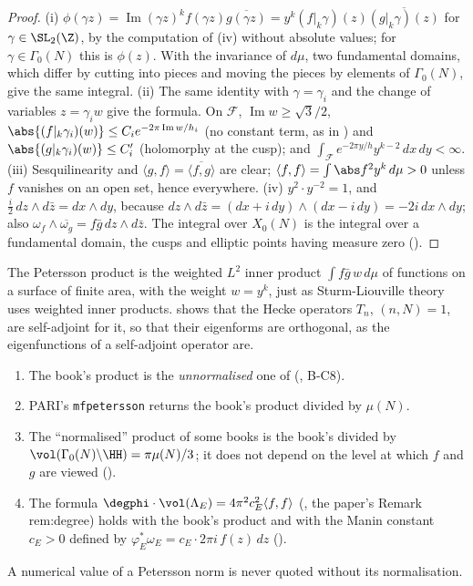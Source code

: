 \begin{proof}
(i) $\phi(\gamma z)=\operatorname{Im}(\gamma z)^kf(\gamma z)\overline{g(\gamma z)}=y^k(f|_k\gamma)(z)\overline{(g|_k\gamma)(z)}$ for $\gamma\in\SL_2(\Z)$, by the computation of (iv)
without absolute values; for $\gamma\in\Gamma_0(N)$ this is $\phi(z)$. With the invariance of $d\mu$, two fundamental domains, which differ by cutting into pieces and moving the pieces
by elements of $\Gamma_0(N)$, give the same integral.
(ii) The same identity with $\gamma=\gamma_i$ and the change of variables $z=\gamma_iw$ give the formula. On $\mathcal F$, $\operatorname{Im}w\ge\sqrt3/2$, $\abs{(f|_k\gamma_i)(w)}\le C_ie^{-2\pi\operatorname{Im}w/h_i}$
(no constant term, as in ) and $\abs{(g|_k\gamma_i)(w)}\le C_i'$ (holomorphy at the cusp); and $\int_{\mathcal F}e^{-2\pi y/h}y^{k-2}\,dx\,dy<\infty$.
(iii) Sesquilinearity and $\langle g,f\rangle=\overline{\langle f,g\rangle}$ are clear; $\langle f,f\rangle=\int\abs f^2y^k\,d\mu>0$ unless $f$ vanishes on an open set, hence everywhere.
(iv) $y^2\cdot y^{-2}=1$, and $\frac i2\,dz\wedge d\bar z=dx\wedge dy$, because $dz\wedge d\bar z=(dx+i\,dy)\wedge(dx-i\,dy)=-2i\,dx\wedge dy$; also
$\omega_f\wedge\overline{\omega_g}=f\bar g\,dz\wedge d\bar z$. The integral over $X_0(N)$ is the integral over a fundamental domain, the cusps and elliptic points having measure
zero ().
\end{proof}

The Petersson product is the weighted $L^2$ inner product $\int f\bar g\,w\,d\mu$ of functions on a surface of finite area, with the weight $w=y^k$, just as Sturm-Liouville
theory uses weighted inner products.  shows that the Hecke operators $T_n$, $(n,N)=1$, are self-adjoint for it, so that their eigenforms are orthogonal, as
the eigenfunctions of a self-adjoint operator are.

\begin{convention}\label{conv:modforms:petersson-normalisations}
\leavevmode
\begin{enumerate}[label=(\alph*)]
\item The book's product is the \emph{unnormalised} one of  (, B-C8).
\item PARI's \texttt{mfpetersson} returns the book's product divided by $\mu(N)$.
\item The ``normalised'' product of some books is the book's divided by $\vol(\Gamma_0(N)\backslash\HH)=\pi\mu(N)/3$; it does not depend on the level at which $f$ and $g$ are viewed
().
\item The formula $\degphi\cdot\vol(\Lambda_E)=4\pi^2c_E^2\langle f,f\rangle$ (, the paper's Remark rem:degree) holds with the book's product and with the Manin constant
$c_E>0$ defined by $\varphi_E^*\omega_E=c_E\cdot2\pi i\,f(z)\,dz$ ().
\end{enumerate}
A numerical value of a Petersson norm is never quoted without its normalisation.
\end{convention}

